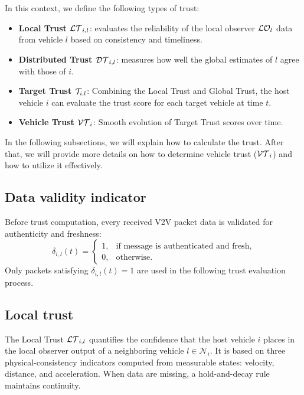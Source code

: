 In this context, we define the following types of trust:
\begin{itemize}
    \item \textbf{Local Trust $\mathcal{LT}_{i,l}$}: evaluates the reliability of the local observer $\mathcal{LO}_{l}$ data from vehicle $l$ based on consistency and timeliness.
    \item \textbf{Distributed Trust $\mathcal{DT}_{i,l}$}: measures how well the global estimates of $l$ agree with those of $i$.
    \item \textbf{Target Trust $\mathcal{T}_{i,l}$}: Combining the Local Trust and Global Trust,  the host vehicle $i$ can evaluate the trust score for each target vehicle at time $t$.
    \item \textbf{Vehicle Trust $\mathcal{VT}_{i}$}: Smooth evolution of Target Trust scores over time.
\end{itemize}

In the following subsections, we will explain how to calculate the trust. After that, we will provide more details on how to determine vehicle trust ($\mathcal{VT}_{i}$) and how to utilize it effectively.
\vspace*{-0.3cm}
\subsection{Data validity indicator}
\vspace*{-0.3cm}

Before trust computation, every received V2V packet data is validated for authenticity and freshness:
\begin{equation}
    \delta_{i,l}(t)=
    \begin{cases}
        1, & \text{if message}\text{ is authenticated and fresh}, \\
        0, & \text{otherwise.}
    \end{cases}
\end{equation}
Only packets satisfying $\delta_{i,l}(t)=1$ are used in the following trust evaluation process.

\vspace*{-0.3cm}
\subsection{Local trust}\label{sub:local_trust}
\vspace*{-0.3cm}

The Local Trust $\mathcal{LT}_{i,l}$ quantifies the confidence that the host vehicle $i$ places in the local observer output of a neighboring vehicle $l \in \mathcal N_i$. 
It is based on three physical-consistency indicators computed from measurable states: velocity, distance, and acceleration. When data are missing, a hold-and-decay rule maintains continuity.


